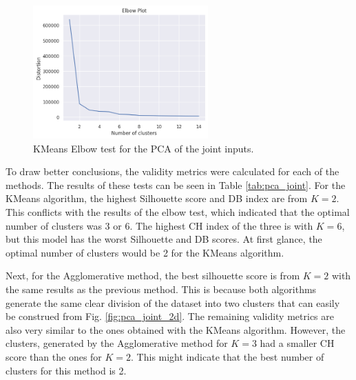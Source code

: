 \begin{figure}[h]
    \caption{KMeans Elbow test for the PCA of the joint inputs.}
    \label{fig:pca_joint_elbow}
    \includegraphics[width=0.6\textwidth]{figures/pca_joint_elbow_test.png}
\end{figure}

To draw better conclusions, the validity metrics were calculated for each of the methods. The results of these tests can be seen in Table \ref{tab:pca_joint}. For the KMeans algorithm, the highest Silhouette score and DB index are from $K=2$. This conflicts with the results of the elbow test, which indicated that the optimal number of clusters was 3 or 6. The highest CH index of the three is with $K=6$, but this model has the worst Silhouette and DB scores. At first glance, the optimal number of clusters would be 2 for the KMeans algorithm.

Next, for the Agglomerative method, the best silhouette score is from $K=2$ with the same results as the previous method. This is because both algorithms generate the same clear division of the dataset into two clusters that can easily be construed from Fig. \ref{fig:pca_joint_2d}. The remaining validity metrics are also very similar to the ones obtained with the KMeans algorithm. However, the clusters, generated by the Agglomerative method for $K=3$ had a smaller CH score than the ones for $K=2$. This might indicate that the best number of clusters for this method is 2.


